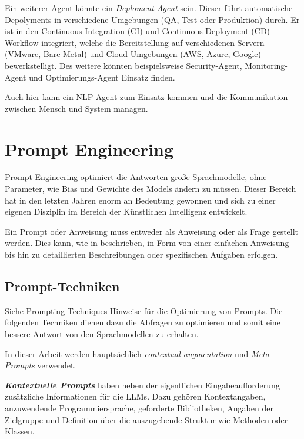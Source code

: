 Ein weiterer Agent könnte ein \textit{Deploment-Agent} sein. Dieser führt automatische Depolyments in verschiedene Umgebungen (QA, Test oder Produktion) durch. Er ist in den Continuous Integration (CI) und Continuous Deployment (CD) Workflow integriert, welche die Bereitstellung auf verschiedenen Servern (VMware, Bare-Metal) und Cloud-Umgebungen (AWS, Azure, Google) bewerkstelligt. Des weitere könnten beispielsweise Security-Agent, Monitoring-Agent und Optimierungs-Agent Einsatz finden.\vspace{0.2cm}

Auch hier kann ein NLP-Agent zum Einsatz kommen und die Kommunikation zwischen Mensch und System managen.



\section{Prompt Engineering}
Prompt Engineering optimiert die Antworten große Sprachmodelle, ohne Parameter, wie Bias und Gewichte des Models ändern zu müssen. Dieser Bereich hat in den letzten Jahren enorm an Bedeutung gewonnen und sich zu einer eigenen Disziplin im Bereich der Künstlichen Intelligenz entwickelt.\vspace{0.2cm}

Ein Prompt oder Anweisung muss entweder als Anweisung oder als Frage gestellt werden. Dies kann, wie in \cite{amatriain-2024} beschrieben, in Form von einer einfachen Anweisung bis hin zu detaillierten Beschreibungen oder spezifischen Aufgaben erfolgen.

\subsection{Prompt-Techniken}\label{subsec:prompt_technics}
Siehe Prompting Techniques Hinweise für die Optimierung von Prompts.
Die folgenden Techniken dienen dazu die Abfragen zu optimieren und somit eine bessere Antwort von den Sprachmodellen zu erhalten.

In dieser Arbeit werden hauptsächlich \textit{contextual augmentation} und \textit{Meta-Prompts} verwendet.\vspace{0.2cm}

\textbf{\textit{Kontextuelle Prompts}} haben neben der eigentlichen Eingabeaufforderung zusätzliche Informationen für die LLMs. Dazu gehören Kontextangaben, anzuwendende Programmiersprache, geforderte Bibliotheken, Angaben der Zielgruppe und Definition über die auszugebende Struktur wie Methoden oder Klassen.\vspace{0.2cm}


